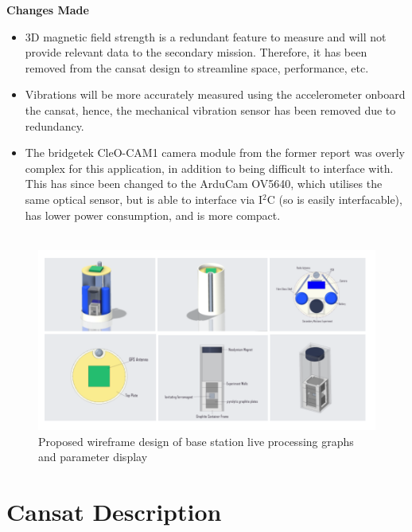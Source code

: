 \documentclass{report}
\begin{document}
		{\color{blue} \textbf{Changes Made}
		\begin{itemize}
			\item 3D magnetic field strength is a redundant feature to measure
			and will not provide relevant data to the secondary mission. Therefore,
			it has been removed from the cansat design to streamline space, 
			performance, etc.
			\item Vibrations will be more accurately measured using the 
			accelerometer onboard the cansat, hence, the mechanical vibration
			sensor has been removed due to redundancy.
			\item The bridgetek CleO-CAM1 camera module from the former 
			report was overly complex for this application, in addition to being
			difficult to interface with. This has since been changed to the ArduCam
			OV5640, which utilises the same optical sensor, but is able to interface
			via I$^2$C (so is easily interfacable), has lower power consumption, and
			is more compact.\\\\
		\end{itemize}
		}
		

		\begin{figure}[H]
			\begin{center}
				\includegraphics[width=\textwidth]{CadRenders}
			\end{center}
			\vspace{-15pt}
			\caption{Proposed wireframe design of base station live processing graphs
			and parameter display}
		\end{figure}


\chapter{Cansat Description}
\end{document}
